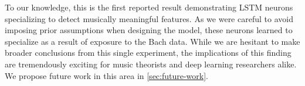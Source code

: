 To our knowledge, this is the first reported result demonstrating LSTM neurons
specializing to detect musically meaningful features. As we were careful to
avoid imposing prior assumptions when designing the model, these neurons
learned to specialize as a result of exposure to the Bach data. While we are
hesitant to make broader conclusions from this single experiment, the
implications of this finding are tremendously exciting for music theorists
and deep learning researchers alike. We propose future work in this area
in \vref{sec:future-work}.

